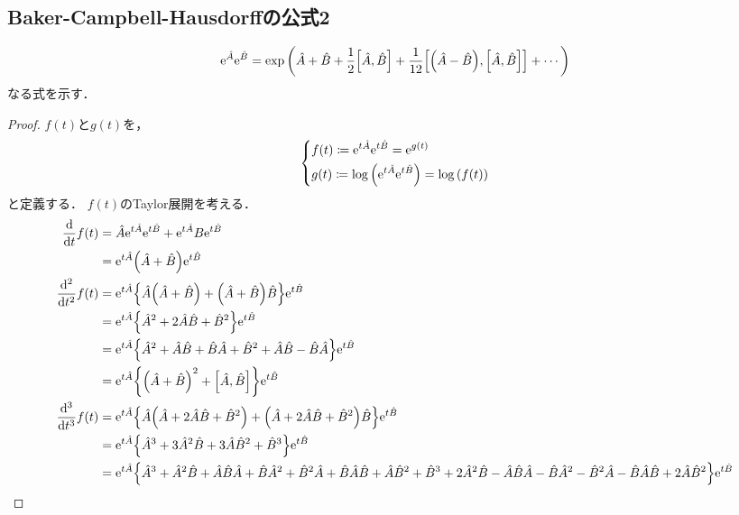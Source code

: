 \documentclass{report}
\begin{document}
  \subsection{Baker-Campbell-Hausdorffの公式2}
    \begin{align}
      \mathrm{e}^{\hat{A}}\mathrm{e}^{\hat{B}} = \exp\qty(\hat{A} + \hat{B} + \frac{1}{2}\qty[\hat{A}, \hat{B}] + \frac{1}{12}\qty[\qty(\hat{A} - \hat{B}), \qty[\hat{A}, \hat{B}]] + \cdots)
    \end{align}
    なる式を示す．
    \begin{proof}
      $f(t)$と$g(t)$を，
      \begin{align}
        \begin{dcases}
          f(t) \coloneqq \mathrm{e}^{t\hat{A}}\mathrm{e}^{t\hat{B}} = \mathrm{e}^{g(t)} \\ 
          g(t) \coloneqq \log\qty(\mathrm{e}^{t\hat{A}}\mathrm{e}^{t\hat{B}}) = \log\qty(f(t))
        \end{dcases}
      \end{align}
      と定義する．
      $f(t)$のTaylor展開を考える．
      \begin{align}
        \dv{t}f(t) &= \hat{A}\e^{t\hat{A}}\e^{t\hat{B}} + \e^{t\hat{A}}B\e^{t\hat{B}} \\ 
        &= \e^{t\hat{A}}\qty(\hat{A} + \hat{B})\e^{t\hat{B}} \\ 
        \dv[2]{t}f(t) &= \e^{t\hat{A}}\qty{\hat{A}\qty(\hat{A} + \hat{B}) + \qty(\hat{A} + \hat{B})\hat{B}}\e^{t\hat{B}} \\ 
        &= \e^{t\hat{A}}\qty{\hat{A}^2 + 2\hat{A}\hat{B} + \hat{B}^2}\e^{t\hat{B}} \\
        &= \e^{t\hat{A}}\qty{\hat{A}^2 + \hat{A}\hat{B} + \hat{B}\hat{A} + \hat{B}^2 + \hat{A}\hat{B} - \hat{B}\hat{A}}\e^{t\hat{B}} \\ 
        &= \e^{t\hat{A}}\qty{\qty(\hat{A} + \hat{B})^2 + \qty[\hat{A}, \hat{B}]}\e^{t\hat{B}} \\ 
        \dv[3]{t}f(t) &= \e^{t\hat{A}}\qty{\hat{A}\qty(\hat{A} + 2\hat{A}\hat{B} + \hat{B}^2) + \qty(\hat{A} + 2\hat{A}\hat{B} + \hat{B}^2)\hat{B}}\e^{t\hat{B}} \\ 
        &= \e^{t\hat{A}}\qty{\hat{A}^3 + 3\hat{A}^2\hat{B} + 3\hat{A}\hat{B}^2 + \hat{B}^3}\e^{t\hat{B}} \\ 
        &= \e^{t\hat{A}}\qty{\hat{A}^3 + \hat{A}^2\hat{B} + \hat{A}\hat{B}\hat{A} + \hat{B}\hat{A}^2 + \hat{B}^2\hat{A} + \hat{B}\hat{A}\hat{B} + \hat{A}\hat{B}^2 + \hat{B}^3 + 2\hat{A}^2\hat{B} - \hat{A}\hat{B}\hat{A} - \hat{B}\hat{A}^2 - \hat{B}^2\hat{A} - \hat{B}\hat{A}\hat{B} + 2\hat{A}\hat{B}^2}\e^{t\hat{B}} \\ 

\end{align}
\end{proof}
\end{document}
